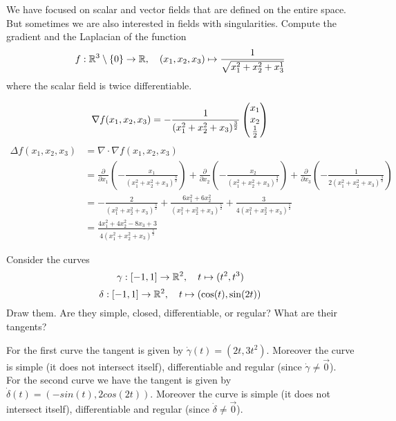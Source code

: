 \documentclass[11pt]{article}
\begin{document}

\begin{exercise}
    We have focused on scalar and vector fields that are defined on the entire space. 
    But sometimes we are also interested in fields with singularities. 
    Compute the gradient and the Laplacian of the function 
    \[
        f : \mathbb{R}^3 \setminus \{0\} \rightarrow \mathbb{R}, \quad (x_1,x_2,x_3) \mapsto \frac{1}{\sqrt{x_1^2+x_2^2+x_3^1}}
    \]
    where the scalar field is twice differentiable. 
\end{exercise}
\begin{solution}   
    $$
        \nabla f(x_1,x_2,x_3)
        =
        -\frac{1}{(x_1^2+x_2^2+x_3)^{\frac{3}{2}}} \begin{pmatrix}x_1\\ x_2\\\frac{1}{2}\end{pmatrix}
    $$ 
    \begin{align*}
        \Delta f(x_1,x_2,x_3) 
        &=
        \nabla \cdot \nabla f(x_1,x_2,x_3) 
        \\
        &= \frac{\partial}{\partial x_1}\left(-\frac{x_1}{(x_1^2+x_2^2+x_3)^{\frac{3}{2}}} \right)
        + \frac{\partial}{\partial x_2}\left(-\frac{x_2}{(x_1^2+x_2^2+x_3)^{\frac{3}{2}}}\right)
        + \frac{\partial}{\partial x_3}\left(-\frac{1}{2(x_1^2+x_2^2+x_3)^{\frac{3}{2}}} \right)
        \\
        &= 
        - \frac{2}{(x_1^2+x_2^2+x_3)^{\frac{3}{2}}}
        + \frac{6x_1^2 + 6x_2^2}{(x_1^2+x_2^2+x_3)^{\frac{5}{2}}}
        + \frac{3}{4(x_1^2+x_2^2+x_3)^{\frac{5}{2}}}
        \\
        &=
        \frac{4x_1^2 + 4x_2^2 -8x_3 +3}{4(x_1^2+x_2^2+x_3)^{\frac{5}{2}}}
    \end{align*}
\end{solution}

\begin{exercise}
    Consider the curves 
    \[
        \gamma : [-1,1] \rightarrow \mathbb{R}^2, \quad t \mapsto ( t^2, t^3 )
    \]
    \[
        \delta : [-1,1] \rightarrow \mathbb{R}^2, \quad t \mapsto ( \cos(t), \sin(2t) )
    \]
    Draw them. Are they simple, closed, differentiable, or regular? What are their tangents?
\end{exercise}
\begin{solution}    
    For the first curve the tangent is given by $\dot{\gamma}(t) = (2t, 3t^2)$.
    Moreover the curve is simple (it does not intersect itself), differentiable and regular (since $\dot{\gamma} \neq \vec{0}$).
    \\

    For the second curve we have the tangent is given by $\dot{\delta}(t) = (-sin(t),2cos(2t))$.
    Moreover the curve is simple (it does not intersect itself), differentiable and regular (since $\dot{\delta} \neq \vec{0}$).
\end{solution}
\end{document}
